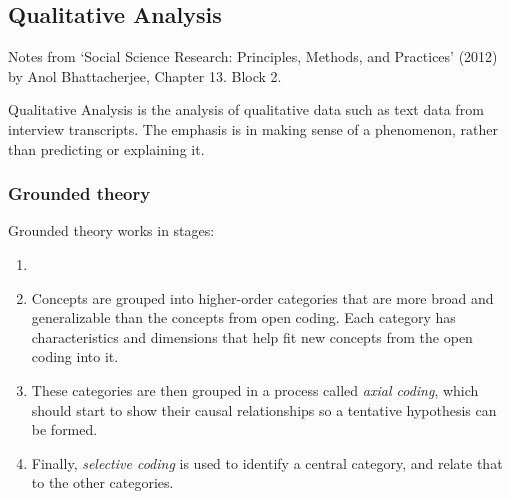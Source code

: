 
\subsection{Qualitative Analysis}
\begin{flushright}
  \scriptsize Notes from `Social Science Research: Principles, Methods, and
  Practices' (2012) by Anol Bhattacherjee, Chapter 13. Block 2.
\end{flushright}


Qualitative Analysis is the analysis of qualitative data such as
text data from interview transcripts. The emphasis is in making sense
of a phenomenon, rather than predicting or explaining it.


\subsubsection{Grounded theory}


Grounded theory works in stages:
\begin{enumerate}
  \item {}
  \item Concepts are grouped into higher-order categories that are more
    broad and generalizable than the concepts from open coding. Each
    category has characteristics and dimensions that help fit new
    concepts from the open coding into it.
  \item These categories are then grouped in a process called
    \textit{axial coding}, which should start to show their causal
    relationships so a tentative hypothesis can be formed.
  \item Finally, \textit{selective coding} is used to identify a
    central category, and relate that to the other categories.
\end{enumerate}

